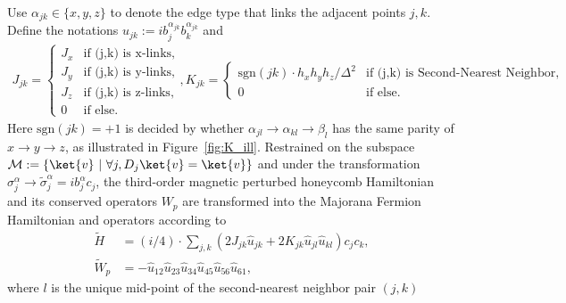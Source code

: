 \begin{theorem}\label{theo:cal_ferm}
   Use $\alpha_{jk} \in \{x,y,z\}$ to denote the edge type that links the adjacent points $j,k$. Define the notations $\hat u_{jk}:= i b_j^{\alpha_{jk}}b_k^{\alpha_{jk}}$ and 
   \begin{align}
       J_{{jk}} = \begin{cases}J_x &\text{if (j,k) is x-links,}\\J_y &\text{if (j,k) is y-links,}\\J_z &\text{if (j,k) is z-links,}\\0 &\text{if else.}\end{cases}, K_{jk} = \begin{cases}\text{sgn}(jk) \cdot h_x h_yh_z/\Delta^2 &\text{if (j,k) is Second-Nearest Neighbor,}\\0 &\text{if else.}\end{cases}
   \end{align}
   Here $\text{sgn}(jk) = +1$ is decided by whether $\alpha_{jl}\to \alpha_{kl} \to \beta_{l}$ has the same parity of $x \to y \to z$, as illustrated in Figure~\ref{fig:K_ill}.
   Restrained on the subspace $\mathcal{M}:= \{\ket{v} ~|~\forall j, D_j\ket{v} =  \ket{v}\}$  and under the transformation $\sigma_j^{\alpha} \to \tilde{\sigma}_j^{\alpha}=i b_j^{\alpha}c_j$, the third-order magnetic perturbed honeycomb Hamiltonian and its conserved operators $W_p$ are transformed into the Majorana Fermion Hamiltonian and operators according to
    \begin{align}
        \tilde H&= ({i}/{4})\cdot \sum_{j,k} (2J_{{jk}}\hat u_{jk} + 2K_{jk}\hat  u_{jl}\hat u_{kl}) c_j c_k,\label{eq:trans_Ham} \\
        \tilde W_p &= -\hat{u}_{12}\hat{u}_{23}\hat{u}_{34}\hat{u}_{45}\hat{u}_{56}\hat{u}_{61},\label{eq:conser_q}
    \end{align}  
    where $l$ is the unique mid-point of the second-nearest neighbor pair $(j,k)$
\end{theorem}
